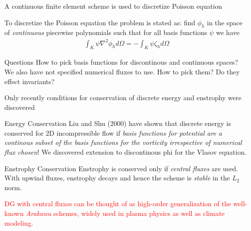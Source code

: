\documentclass[pdf]{beamer}
\newcommand{\mypause}{\pause}
\theoremstyle{definition}
\begin{document}
\begin{frame}{A continuous finite element scheme is used to discretize
    Poisson equation}

  To discretize the Poisson equation the problem is stated as: find
  $\phi_h$ in the space of \emph{continuous} piecewise polynomials
  such that for all basis functions $\psi$ we have
  \begin{align*}
    \int_K \psi \nabla^2 \phi_h d\Omega = -\int_K \psi \zeta_h d\Omega
  \end{align*}
  \mypause
  \begin{block}{Questions}
    How to pick basis functions for discontinous and continuous
    spaces? We also have not specified numerical fluxes to use. How to
    pick them?  Do they effect invariants?
  \end{block}
\end{frame}

\begin{frame}{Only recently conditions for conservation of discrete
    energy and enstrophy were discovered}%
  \small
  \begin{block}{Energy Conservation}
    Liu and Shu (2000) have shown that discrete energy is conserved
    for 2D incompressible flow if \emph{basis functions for potential
      are a continous subset of the basis functions for the vorticity
      irrespective of numerical flux chosen}! We discovered extension
    to discontinous phi for the Vlasov equation.
  \end{block}

  \begin{block}{Enstrophy Conservation}
    Enstrophy is conserved only if \emph{central fluxes} are
    used. With upwind fluxes, enstrophy decays and hence the scheme is
    \emph{stable} in the $L_2$ norm.
  \end{block}

  \mypause \textcolor{red}{DG with central fluxes can be thought of as
    high-order generalization of the well-known \emph{Arakawa}
    schemes, widely used in plasma physics as well as climate
    modeling.}

\end{frame}
\end{document}
